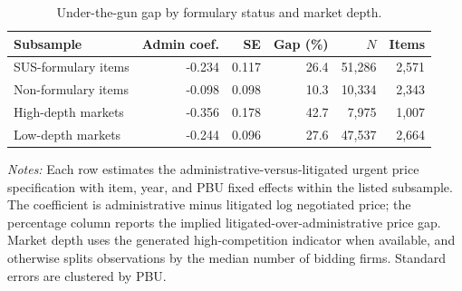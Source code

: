 \begin{table}[ht]
\centering
\caption{Under-the-gun gap by formulary status and market depth.}
\label{tab:market_depth_heterogeneity}
\begin{threeparttable}
\small
\setlength{\tabcolsep}{4pt}
\begin{tabular}{p{.32\linewidth}rrrrr}
\toprule
Subsample & Admin coef. & SE & Gap (\%) & $N$ & Items \\
\midrule
SUS-formulary items & -0.234 & 0.117 & 26.4 & 51,286 & 2,571 \\
Non-formulary items & -0.098 & 0.098 & 10.3 & 10,334 & 2,343 \\
High-depth markets & -0.356 & 0.178 & 42.7 & 7,975 & 1,007 \\
Low-depth markets & -0.244 & 0.096 & 27.6 & 47,537 & 2,664 \\
\bottomrule
\end{tabular}
\begin{tablenotes}[flushleft]\footnotesize
\item \textit{Notes:} Each row estimates the administrative-versus-litigated urgent price specification with item, year, and PBU fixed effects within the listed subsample. The coefficient is administrative minus litigated log negotiated price; the percentage column reports the implied litigated-over-administrative price gap. Market depth uses the generated high-competition indicator when available, and otherwise splits observations by the median number of bidding firms. Standard errors are clustered by PBU.
\end{tablenotes}
\end{threeparttable}
\end{table}
